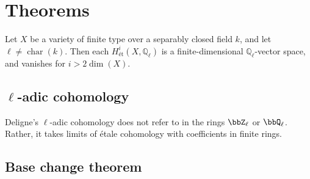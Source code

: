 






\section{Theorems}

\begin{corollary}
Let $X$ be a variety of finite type over a separably closed field $k$, and let $\ell \neq \operatorname{char}(k)$. Then each $H^i_{\text{ét}}(X, \mathbb{Q}_\ell)$ is a finite-dimensional $\mathbb{Q}_\ell$-vector space, and vanishes for $i > 2 \dim(X)$.

\end{corollary}


\subsection{\texorpdfstring{$\ell$}{ell}-adic cohomology}

Deligne's $\ell$-adic cohomology does not refer to  in the rings $\bbZ_\ell$ or $\bbQ_\ell$. Rather, it takes limits of \'etale cohomology with coefficients in finite rings.






\subsection{Base change theorem}

